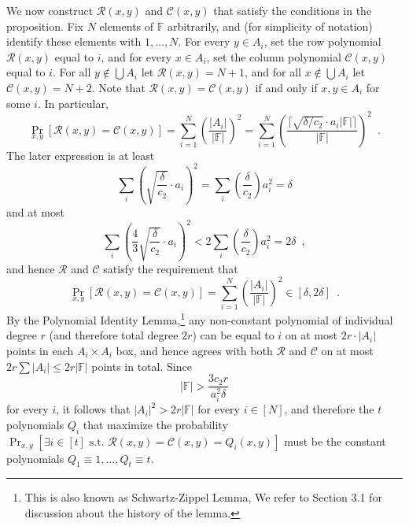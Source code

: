 \documentclass[11pt]{article}
\numberwithin{equation}{section}
\theoremstyle{definition}
\theoremstyle{plain}
\theoremstyle{plain}
\newcommand{\colored}{}
\newcommand{\Field}{\colored{\mathbb F}}
\newcommand{\st}{\colored{\text{ s.t. }}}
\newcommand{\degree}{\colored{r}}
\newcommand{\rowpoly}{\colored{\mathcal R}}
\newcommand{\colpoly}{\colored{\mathcal C}}
\newcommand{\prox}{\colored{\delta}}
\newcommand{\ceil}[1]{{\lceil#1\rceil}}
\newcommand\abs[1]{\colored{\left|#1\right|}}
\begin{document}
We now construct $\rowpoly(x,y)$ and $\colpoly(x,y)$ that satisfy the conditions in the proposition.
Fix $N$ elements of $\Field$ arbitrarily, and (for simplicity of notation) identify these elements with $1,\dots,N$.
For every $y \in A_i$, set the row polynomial $\rowpoly(x,y)$ equal to $i$, and for every $x \in A_i$,
    set the column polynomial $\colpoly(x,y)$ equal to $i$.
    For all $y \notin \bigcup A_i$ let $\rowpoly(x,y) = N+1$,
    and for all $x \notin \bigcup A_i$ let $\colpoly(x,y) = N+2$.
    Note that $\rowpoly(x,y) = \colpoly(x,y)$ if and only if $x,y \in A_i$ for some $i$.
    In particular,
    \begin{equation*}
        \Pr_{x,y}[\rowpoly(x,y) = \colpoly(x,y)] = \sum_{i=1}^N \left( \frac{\abs{A_i}}{\abs{\Field}} \right)^2
        = \sum_{i=1}^N \left(\frac{\ceil{\sqrt{\prox/c_2} \cdot a_i \abs{\Field}}}{\abs{\Field}} \right)^2
        \enspace.
    \end{equation*}
    The later expression is at least
    \[
      \sum_{i} \left(\sqrt{\frac{\prox}{c_2}} \cdot a_i\right)^2 = \sum_{i} \left(\frac{\prox}{c_2}\right) a_i^2 = \prox
    \]
    and at most
    \[
      \sum_{i} \left(\frac{4}{3} \sqrt{\frac{\prox}{c_2}} \cdot a_i\right)^2  < 2\sum_{i} \left(\frac{\prox}{c_2}\right) a_i^2  = 2\prox\enspace,
      \]
    and hence $\rowpoly$ and $\colpoly$ satisfy the requirement that
    \begin{equation*}
        \Pr_{x,y}[\rowpoly(x,y) = \colpoly(x,y)] = \sum_{i=1}^N \left( \frac{\abs{A_i}}{\abs{\Field}} \right)^2
        \in [\prox, 2\prox]
        \enspace.
    \end{equation*}
    By the %
%
%
%
%
%
%
%
%
    Polynomial Identity Lemma,\footnote{This is also known as Schwartz-Zippel Lemma,                %
      We refer to \cite{arvind} Section 3.1 for discussion about the history of the lemma.}           %
    any non-constant polynomial of individual degree $\degree$ (and therefore total degree $2 \degree$) can be equal to $i$
    on at most $2\degree \cdot \abs{A_i}$ points in each $A_i \times A_i$ box, and hence
    agrees with both $\rowpoly$ and $\colpoly$ on at most $2\degree \sum \abs{A_i} \leq 2\degree \abs{\Field}$
    points in total. Since
    \[
      \abs{\Field} > \frac{3 c_2 \degree}{a_i^2\prox}
    \]
    for every $i$, it follows that $\abs{A_i}^2 > 2\degree \abs{\Field}$ for every $i \in [N]$,
    and therefore the $t$ polynomials $Q_i$ that maximize the probability
    $\Pr_{x,y}[\exists i \in [t] \st \rowpoly(x,y) = \colpoly(x,y) = Q_i(x,y)]$
   must be the constant polynomials $Q_1 \equiv 1,\dots,Q_t \equiv t$.
\end{document}
